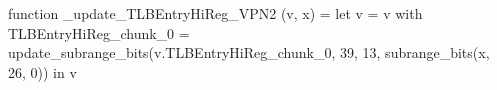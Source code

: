 function _update_TLBEntryHiReg_VPN2 (v, x) = let v = { v with TLBEntryHiReg_chunk_0 = update_subrange_bits(v.TLBEntryHiReg_chunk_0, 39, 13, subrange_bits(x, 26, 0)) } in
  v

